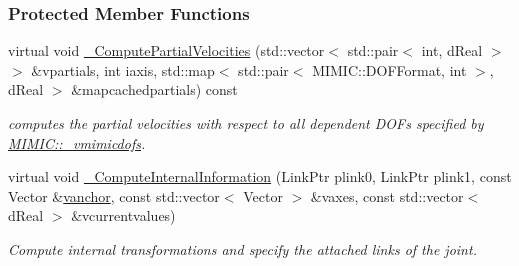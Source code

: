 \subsubsection*{Protected Member Functions}
\begin{DoxyCompactItemize}
\item 
virtual void \hyperlink{classOpenRAVE_1_1KinBody_1_1Joint_aa78a272e319f192cece4bb8662a64cc2}{\_\-ComputePartialVelocities} (std::vector$<$ std::pair$<$ int, dReal $>$ $>$ \&vpartials, int iaxis, std::map$<$ std::pair$<$ MIMIC::DOFFormat, int $>$, dReal $>$ \&mapcachedpartials) const 
\begin{DoxyCompactList}\small\item\em computes the partial velocities with respect to all dependent DOFs specified by \hyperlink{structOpenRAVE_1_1KinBody_1_1Joint_1_1MIMIC_a88385fe7c2cecd8d6e625252f60a8f1f}{MIMIC::\_\-vmimicdofs}. \item\end{DoxyCompactList}\item 
virtual void \hyperlink{classOpenRAVE_1_1KinBody_1_1Joint_a44e669248f1eb1fe09308bf98bd2d292}{\_\-ComputeInternalInformation} (LinkPtr plink0, LinkPtr plink1, const Vector \&\hyperlink{classOpenRAVE_1_1KinBody_1_1Joint_a64804ea505aa46e8a50d81d31cdb927d}{vanchor}, const std::vector$<$ Vector $>$ \&vaxes, const std::vector$<$ dReal $>$ \&vcurrentvalues)
\begin{DoxyCompactList}\small\item\em Compute internal transformations and specify the attached links of the joint. \item\end{DoxyCompactList}\end{DoxyCompactItemize}

